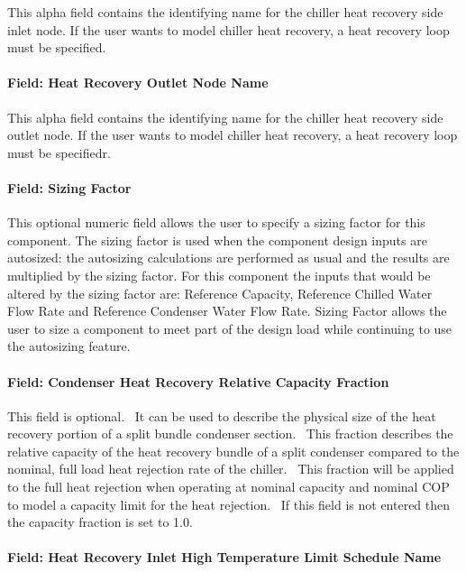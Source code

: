 This alpha field contains the identifying name for the chiller heat recovery side inlet node. If the user wants to model chiller heat recovery, a heat recovery loop must be specified.

\paragraph{Field: Heat Recovery Outlet Node Name}\label{field-heat-recovery-outlet-node-name-2}

This alpha field contains the identifying name for the chiller heat recovery side outlet node. If the user wants to model chiller heat recovery, a heat recovery loop must be specifiedr.

\paragraph{Field: Sizing Factor}\label{field-sizing-factor-5}

This optional numeric field allows the user to specify a sizing factor for this component. The sizing factor is used when the component design inputs are autosized: the autosizing calculations are performed as usual and the results are multiplied by the sizing factor. For this component the inputs that would be altered by the sizing factor are: Reference Capacity, Reference Chilled Water Flow Rate and Reference Condenser Water Flow Rate. Sizing Factor allows the user to size a component to meet part of the design load while continuing to use the autosizing feature.

\paragraph{Field: Condenser Heat Recovery Relative Capacity Fraction}\label{field-condenser-heat-recovery-relative-capacity-fraction-2}

This field is optional.~ It can be used to describe the physical size of the heat recovery portion of a split bundle condenser section.~ This fraction describes the relative capacity of the heat recovery bundle of a split condenser compared to the nominal, full load heat rejection rate of the chiller.~ This fraction will be applied to the full heat rejection when operating at nominal capacity and nominal COP to model a capacity limit for the heat rejection.~ If this field is not entered then the capacity fraction is set to 1.0.

\paragraph{Field: Heat Recovery Inlet High Temperature Limit Schedule Name}\label{field-heat-recovery-inlet-high-temperature-limit-schedule-name-2}

